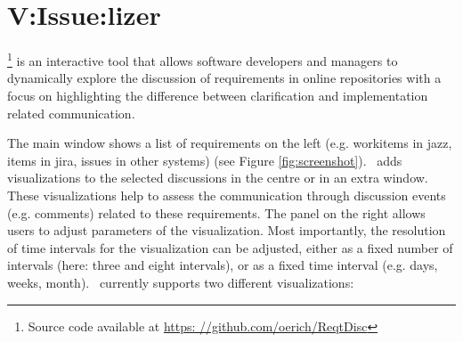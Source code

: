 \section{V:Issue:lizer}


\viss \footnote{Source code available at \url{https: //github.com/oerich/ReqtDisc}} is an interactive tool that allows software developers and managers to dynamically explore the discussion of requirements  in online repositories with a focus on highlighting the difference between clarification and implementation related communication.


The main window shows a list of requirements on the  left (e.g. workitems in jazz, items in jira, issues in other systems) (see Figure \ref{fig:screenshot}).
\viss\ adds visualizations to the selected discussions in the centre or in an extra window. 
These visualizations help to assess the communication through discussion events (e.g. comments) related to these requirements.
The panel on the right allows users to adjust parameters of the visualization.
Most importantly, the resolution of time intervals for the visualization can be adjusted, either as a fixed number of intervals (here: three and eight intervals), or as a fixed time interval (e.g. days, weeks, month).
%
\viss\ currently supports two different visualizations: 

